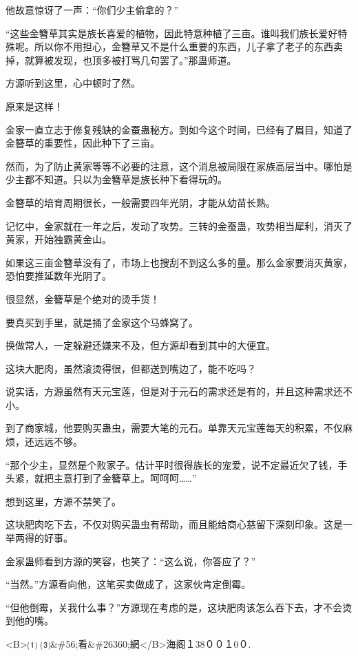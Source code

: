 \begin{this_body}
他故意惊讶了一声：“你们少主偷拿的？”

“这些金簪草其实是族长喜爱的植物，因此特意种植了三亩。谁叫我们族长爱好特殊呢。所以你不用担心，金簪草又不是什么重要的东西，儿子拿了老子的东西卖掉，就算被发现，也顶多被打骂几句罢了。”那蛊师道。

方源听到这里，心中顿时了然。

原来是这样！

金家一直立志于修复残缺的金蚕蛊秘方。到如今这个时间，已经有了眉目，知道了金簪草的重要性，因此种下了三亩。

然而，为了防止黄家等等不必要的注意，这个消息被局限在家族高层当中。哪怕是少主都不知道。只以为金簪草是族长种下看得玩的。

金簪草的培育周期很长，一般需要四年光阴，才能从幼苗长熟。

记忆中，金家就在一年之后，发动了攻势。三转的金蚕蛊，攻势相当犀利，消灭了黄家，开始独霸黄金山。

如果这三亩金簪草没有了，市场上也搜刮不到这么多的量。那么金家要消灭黄家，恐怕要推延数年光阴了。

很显然，金簪草是个绝对的烫手货！

要真买到手里，就是捅了金家这个马蜂窝了。

换做常人，一定躲避还嫌来不及，但方源却看到其中的大便宜。

这块大肥肉，虽然滚烫得很，但都送到嘴边了，能不吃吗？

说实话，方源虽然有天元宝莲，但是对于元石的需求还是有的，并且这种需求还不小。

到了商家城，他要购买蛊虫，需要大笔的元石。单靠天元宝莲每天的积累，不仅麻烦，还远远不够。

“那个少主，显然是个败家子。估计平时很得族长的宠爱，说不定最近欠了钱，手头紧，就把主意打到了金簪草上。呵呵呵……”

想到这里，方源不禁笑了。

这块肥肉吃下去，不仅对购买蛊虫有帮助，而且能给商心慈留下深刻印象。这是一举两得的好事。

金家蛊师看到方源的笑容，也笑了：“这么说，你答应了？”

“当然。”方源看向他，这笔买卖做成了，这家伙肯定倒霉。

“但他倒霉，关我什么事？”方源现在考虑的是，这块肥肉该怎么吞下去，才不会烫到他的嘴。

<B>⑴ ⑶\&\#56;看\&\#26360;網</B>海阁１38００１0０.

\end{this_body}


